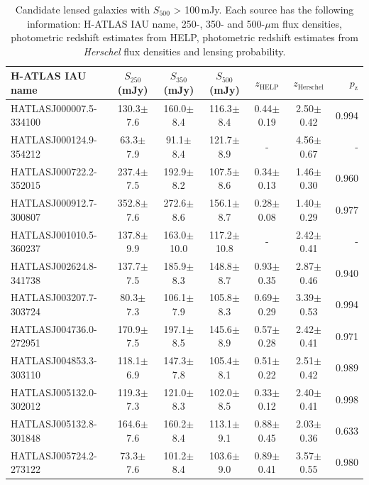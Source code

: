 \documentclass[fleqn,usenatbib]{mnras}
\begin{document}
\begin{table}
	\centering
	\begin{threeparttable}
	\caption{Candidate lensed galaxies with $S_{500}$ > 100\,mJy. Each source has the following information: H-ATLAS IAU name, 250-, 350- and 500-$\mu$m flux densities, photometric redshift estimates from HELP, photometric redshift estimates from \textit{Herschel} flux densities and lensing probability.}
	\label{tab:SLG_candidates}
	\begin{tabular}{lcccccr}
		\hline
		\hline
		H-ATLAS IAU name & $S_{250}$ (mJy) & $S_{350}$ (mJy) & $S_{500}$ (mJy) & $z_{\textrm{HELP}}$ & $z_{\textrm{Herschel}}$ & $p_{\textrm{z}}$ \\
		\hline
		HATLASJ000007.5-334100 & 130.3$\pm$7.6 & 160.0$\pm$8.4 & 116.3$\pm$8.4 & 0.44$\pm$0.19 & 2.50$\pm$0.42 & 0.994 \\
		HATLASJ000124.9-354212\tnote{\textdagger} & 63.3$\pm$7.9 & 91.1$\pm$8.4 & 121.7$\pm$8.9 & - & 4.56$\pm$0.67 & - \\
		HATLASJ000722.2-352015 & 237.4$\pm$7.5 & 192.9$\pm$8.2 & 107.5$\pm$8.6 & 0.34$\pm$0.13 & 1.46$\pm$0.30 & 0.960 \\
		HATLASJ000912.7-300807 & 352.8$\pm$7.6 & 272.6$\pm$8.6 & 156.1$\pm$8.7 & 0.28$\pm$0.08 & 1.40$\pm$0.29 & 0.977 \\
		HATLASJ001010.5-360237\tnote{\textdagger} & 137.8$\pm$9.9 & 163.0$\pm$10.0 & 117.2$\pm$10.8 & - & 2.42$\pm$0.41 & - \\
		HATLASJ002624.8-341738 & 137.7$\pm$7.5 & 185.9$\pm$8.3 & 148.8$\pm$8.7 & 0.93$\pm$0.35 & 2.87$\pm$0.46 & 0.940 \\
		HATLASJ003207.7-303724 & 80.3$\pm$7.3 & 106.1$\pm$7.9 & 105.8$\pm$8.3 & 0.69$\pm$0.29 & 3.39$\pm$0.53 & 0.994 \\ 
		HATLASJ004736.0-272951 & 170.9$\pm$7.5 & 197.1$\pm$8.5 & 145.6$\pm$8.9 & 0.57$\pm$0.28 & 2.42$\pm$0.41 & 0.971 \\ 
		HATLASJ004853.3-303110 & 118.1$\pm$6.9 & 147.3$\pm$7.8 & 105.4$\pm$8.1 & 0.51$\pm$0.22 & 2.51$\pm$0.42 & 0.989 \\ 
		HATLASJ005132.0-302012 & 119.3$\pm$7.3 & 121.0$\pm$8.3 & 102.0$\pm$8.5 & 0.33$\pm$0.12 & 2.40$\pm$0.41 & 0.998 \\
		HATLASJ005132.8-301848 & 164.6$\pm$7.6 & 160.2$\pm$8.4 & 113.1$\pm$9.1 & 0.88$\pm$0.45 & 2.03$\pm$0.36 & 0.633 \\
		HATLASJ005724.2-273122 & 73.3$\pm$7.6 & 101.2$\pm$8.4 & 103.6$\pm$9.0 & 0.89$\pm$0.41 & 3.57$\pm$0.55 & 0.980 \\

\end{tabular}
\end{threeparttable}
\end{table}
\end{document}
